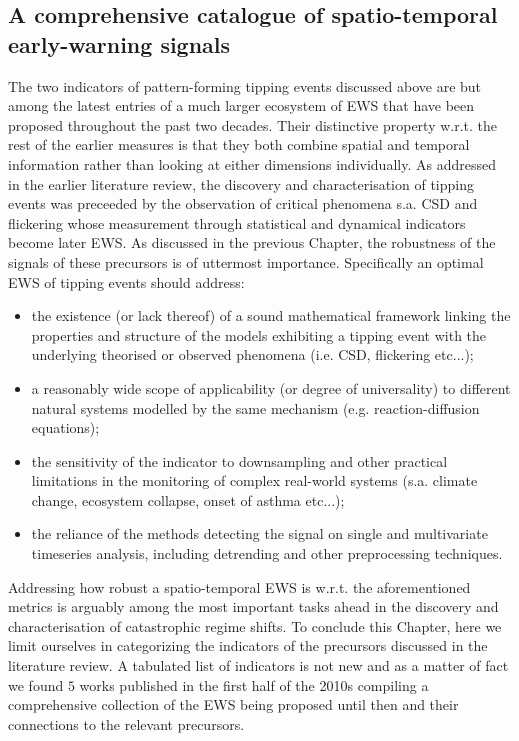 \documentclass[../main.tex]{subfiles}
\begin{document}
\subsection{A comprehensive catalogue of spatio-temporal early-warning signals}\label{subsec2.3}
The two indicators of pattern-forming tipping events discussed above are but among the latest entries of a much larger ecosystem of EWS that have been proposed throughout the past two decades. 
Their distinctive property w.r.t. the rest of the earlier measures is that they both combine spatial and temporal information rather than looking at either dimensions individually.
As addressed in the earlier literature review, the discovery and characterisation of tipping events was preceeded by the observation of critical phenomena s.a. CSD and flickering whose measurement through statistical and dynamical indicators become later EWS.
As discussed in the previous Chapter, the robustness of the signals of these precursors is of uttermost importance.
Specifically an optimal EWS of tipping events should address: 
\begin{itemize}
     \item the existence (or lack thereof) of a sound mathematical framework linking the properties and structure of the models exhibiting a tipping event with the underlying theorised or observed phenomena (i.e. CSD, flickering etc...);
     \item a reasonably wide scope of applicability (or degree of universality) to different natural systems modelled by the same mechanism (e.g. reaction-diffusion equations);
     \item the sensitivity of the indicator to downsampling and other practical limitations in the monitoring of complex real-world systems (s.a. climate change, ecosystem collapse, onset of asthma etc...);
     \item the reliance of the methods detecting the signal on single and multivariate timeseries analysis, including detrending and other preprocessing techniques.
\end{itemize}
Addressing how robust a spatio-temporal EWS is w.r.t. the aforementioned metrics is arguably among the most important tasks ahead in the discovery and characterisation of catastrophic regime shifts. 
To conclude this Chapter, here we limit ourselves in categorizing the indicators of the precursors discussed in the literature review.
A tabulated list of indicators is not new and as a matter of fact we found $5$ works \cite{Lenton11, Dakos12a, Scheffer12, Kefi14, Scheffer15} published in the first half of the 2010s compiling a comprehensive collection of the EWS being proposed until then and their connections to the relevant precursors.
\end{document}
